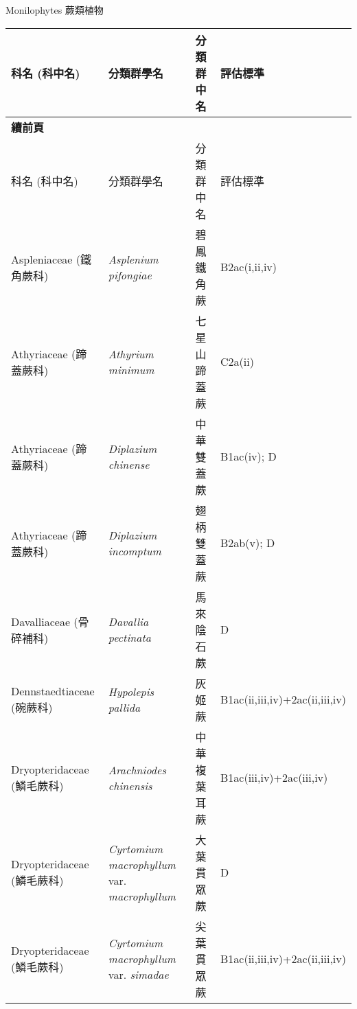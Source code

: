 \noindent\normalfont\selectfont Monilophytes 蕨類植物
\footnotesize\selectfont
        \begin{longtable}{p{3cm}p{5cm}p{3cm}p{4cm}}
        \toprule
          科名 (科中名) & 分類群學名 & 分類群中名 & 評估標準 \\
        \midrule 
        \endfirsthead

        {{\bfseries 續前頁 }} \\
        科名 (科中名) & 分類群學名 & 分類群中名 & 評估標準 \\
        \midrule
        \endhead
                Aspleniaceae (鐵角蕨科) & \textit{Asplenium pifongiae}  & 碧鳳鐵角蕨 & B2ac(i,ii,iv) \index{Asplenium@\textit{Asplenium}!pifongiae@\textit{pifongiae}}  \index{碧鳳鐵角蕨} \\
    Athyriaceae (蹄蓋蕨科) & \textit{Athyrium minimum}  & 七星山蹄蓋蕨 & C2a(ii) \index{Athyrium@\textit{Athyrium}!minimum@\textit{minimum}}  \index{七星山蹄蓋蕨} \\
    Athyriaceae (蹄蓋蕨科) & \textit{Diplazium chinense}  & 中華雙蓋蕨 & B1ac(iv); D \index{Diplazium@\textit{Diplazium}!chinense@\textit{chinense}}  \index{中華雙蓋蕨} \\
    Athyriaceae (蹄蓋蕨科) & \textit{Diplazium incomptum}  & 翅柄雙蓋蕨 & B2ab(v); D \index{Diplazium@\textit{Diplazium}!incomptum@\textit{incomptum}}  \index{翅柄雙蓋蕨} \\
    Davalliaceae (骨碎補科) & \textit{Davallia pectinata}  & 馬來陰石蕨 & D \index{Davallia@\textit{Davallia}!pectinata@\textit{pectinata}}  \index{馬來陰石蕨} \\
    Dennstaedtiaceae (碗蕨科) & \textit{Hypolepis pallida}  & 灰姬蕨 & B1ac(ii,iii,iv)+2ac(ii,iii,iv) \index{Hypolepis@\textit{Hypolepis}!pallida@\textit{pallida}}  \index{灰姬蕨} \\
    Dryopteridaceae (鱗毛蕨科) & \textit{Arachniodes chinensis}  & 中華複葉耳蕨 & B1ac(iii,iv)+2ac(iii,iv) \index{Arachniodes@\textit{Arachniodes}!chinensis@\textit{chinensis}}  \index{中華複葉耳蕨} \\
    Dryopteridaceae (鱗毛蕨科) & \textit{Cyrtomium macrophyllum} var. \textit{macrophyllum}  & 大葉貫眾蕨 & D \index{Cyrtomium@\textit{Cyrtomium}!macrophyllum@\textit{macrophyllum}!var. macrophyllum@var. \textit{macrophyllum}}  \index{大葉貫眾蕨} \\
    Dryopteridaceae (鱗毛蕨科) & \textit{Cyrtomium macrophyllum} var. \textit{simadae}  & 尖葉貫眾蕨 & B1ac(ii,iii,iv)+2ac(ii,iii,iv) \index{Cyrtomium@\textit{Cyrtomium}!macrophyllum@\textit{macrophyllum}!var. simadae@var. \textit{simadae}}  \index{尖葉貫眾蕨} \\

\end{longtable}
